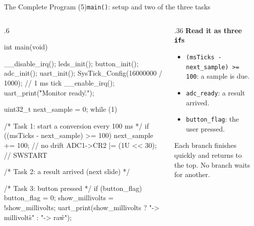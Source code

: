 \documentclass[9pt,aspectratio=169,xcolor=table]{beamer}
\begin{document}
\begin{frame}[fragile]{The Complete Program (5)}{\texttt{main()}: setup and two of the three tasks}
    \begin{columns}[T]
    \begin{column}{.6\textwidth}
\begin{cc}[basicstyle=\ttfamily\scriptsize]
int main(void) {
    __disable_irq();
    leds_init(); button_init();
    adc_init();  uart_init();
    SysTick_Config(16000000 / 1000);  // 1 ms tick
    __enable_irq();
    uart_print("\r\nSensor Monitor ready.\r\n");

    uint32_t next_sample = 0;
    while (1) {
        /* Task 1: start a conversion every 100 ms */
        if ((msTicks - next_sample) >= 100) {
            next_sample += 100;       // no drift
            ADC1->CR2 |= (1U << 30);  // SWSTART
        }

        /* Task 2: a result arrived (next slide) */

        /* Task 3: button pressed */
        if (button_flag) {
            button_flag = 0;
            show_millivolts = !show_millivolts;
            uart_print(show_millivolts
                       ? "-> millivolts\r\n" : "-> raw\r\n");
        }
    }
}
\end{cc}
    \end{column}
    \begin{column}{.36\textwidth}
        \textbf{Read it as three \texttt{if}s}
        {\small
        \begin{itemize}\itemsep2pt
            \item \texttt{(msTicks - next\_sample) >= 100}: a sample is \alert{due}.
            \item \texttt{adc\_ready}: a result \alert{arrived}.
            \item \texttt{button\_flag}: the user \alert{pressed}.
        \end{itemize}}
        \vspace{1mm}
        {\small Each branch finishes quickly and returns to the top. \alert{No branch waits for another.}}
    \end{column}
    \end{columns}
\end{frame}
\end{document}
